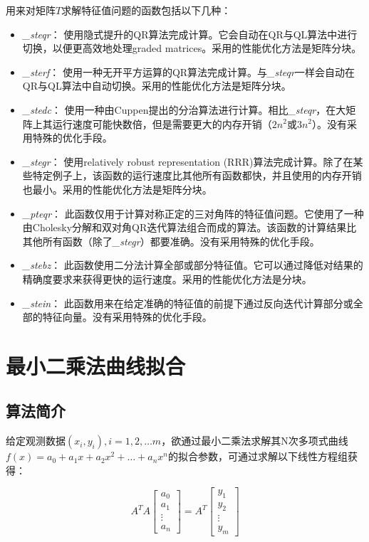 \documentclass[a4paper]{article}
\begin{document}
用来对矩阵$T$求解特征值问题的函数包括以下几种：
\begin{itemize}
  \item \emph{\_steqr}： 使用隐式提升的QR算法完成计算。它会自动在QR与QL算法中进行切换，以便更高效地处理graded matrices。采用的性能优化方法是矩阵分块。
  \item \emph{\_sterf}： 使用一种无开平方运算的QR算法完成计算。与\emph{\_steqr}一样会自动在QR与QL算法中自动切换。采用的性能优化方法是矩阵分块。
  \item \emph{\_stedc}： 使用一种由Cuppen提出的分治算法进行计算。相比\emph{\_steqr}，在大矩阵上其运行速度可能快数倍，但是需要更大的内存开销（$2n^2$或$3n^2$）。没有采用特殊的优化手段。
  \item \emph{\_stegr}： 使用relatively robust representation (RRR)算法完成计算。除了在某些特定例子上，该函数的运行速度比其他所有函数都快，并且使用的内存开销也最小。采用的性能优化方法是矩阵分块。
  \item \emph{\_pteqr}： 此函数仅用于计算对称正定的三对角阵的特征值问题。它使用了一种由Cholesky分解和双对角QR迭代算法组合而成的算法。该函数的计算结果比其他所有函数（除了\emph{\_stegr}）都要准确。没有采用特殊的优化手段。
  \item \emph{\_stebz}： 此函数使用二分法计算全部或部分特征值。它可以通过降低对结果的精确度要求来获得更快的运行速度。采用的性能优化方法是分块。
  \item \emph{\_stein}： 此函数用来在给定准确的特征值的前提下通过反向迭代计算部分或全部的特征向量。没有采用特殊的优化手段。
\end{itemize}

\section{最小二乘法曲线拟合}
\subsection{算法简介}
给定观测数据$(x_i, y_i), i=1, 2, \dots m$，欲通过最小二乘法求解其N次多项式曲线$f(x)=a_0+a_1x+a_2x^2+\dots+a_nx^n$的拟合参数，可通过求解以下线性方程组获得：

\begin{equation*}
  A^TA
  \begin{bmatrix}
    a_0    \\
    a_1    \\
    \vdots \\
    a_n
  \end{bmatrix}
  =A^T
  \begin{bmatrix}
    y_1    \\
    y_2    \\
    \vdots \\
    y_m
  \end{bmatrix}
\end{equation*}
\end{document}
